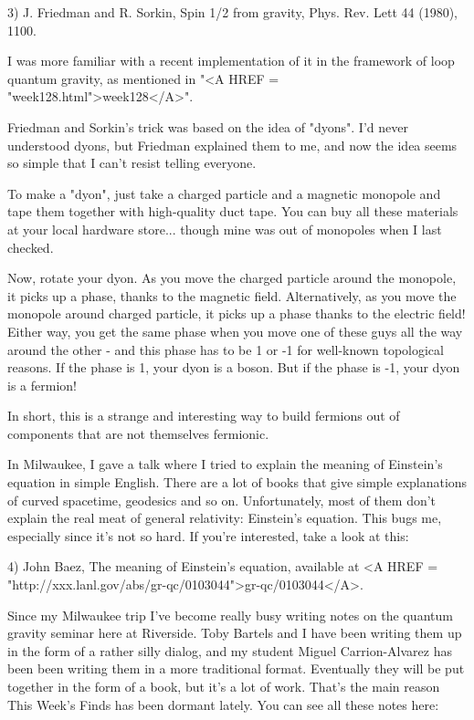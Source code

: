 3) J. Friedman and R. Sorkin, Spin 1/2 from gravity, Phys. Rev. Lett 44
(1980), 1100.

I was more familiar with a recent implementation of it in the framework
of loop quantum gravity, as mentioned in "<A HREF = "week128.html">week128</A>".

Friedman and Sorkin's trick was based on the idea of "dyons".  
I'd never
understood dyons, but Friedman explained them to me, and now the idea
seems so simple that I can't resist telling everyone.  

To make a "dyon", just take a charged particle and a magnetic 
monopole
and tape them together with high-quality duct tape.  You can buy all
these materials at your local hardware store... though mine was out of
monopoles when I last checked.

Now, rotate your dyon.  As you move the charged particle around the
monopole, it picks up a phase, thanks to the magnetic field.  Alternatively,
as you move the monopole around charged particle, it picks up a phase 
thanks to the electric field!  Either way, you get the same phase when
you move one of these guys all the way around the other - and this phase
has to be 1 or -1 for well-known topological reasons.  If the phase is
1, your dyon is a boson.  But if the phase is -1, your dyon is a fermion!  

In short, this is a strange and interesting way to build fermions out of
components that are not themselves fermionic.

In Milwaukee, I gave a talk where I tried to explain the meaning of
Einstein's equation in simple English.  There are a lot of books that
give simple explanations of curved spacetime, geodesics and so on.
Unfortunately, most of them don't explain the real meat of general
relativity: Einstein's equation.  This bugs me, especially since it's
not so hard.  If you're interested, take a look at this:

4) John Baez, The meaning of Einstein's equation, available at 
<A HREF = "http://xxx.lanl.gov/abs/gr-qc/0103044">gr-qc/0103044</A>.  

Since my Milwaukee trip I've become really busy writing notes on the
quantum gravity seminar here at Riverside.  Toby Bartels and I
have been writing them up in
the form of a rather silly dialog, and my student Miguel Carrion-Alvarez
has been been writing them in a more traditional format.  Eventually
they will be put together in the form of a book, but it's a lot of work.
That's the main reason This Week's Finds has been dormant lately.  You
can see all these notes here:

